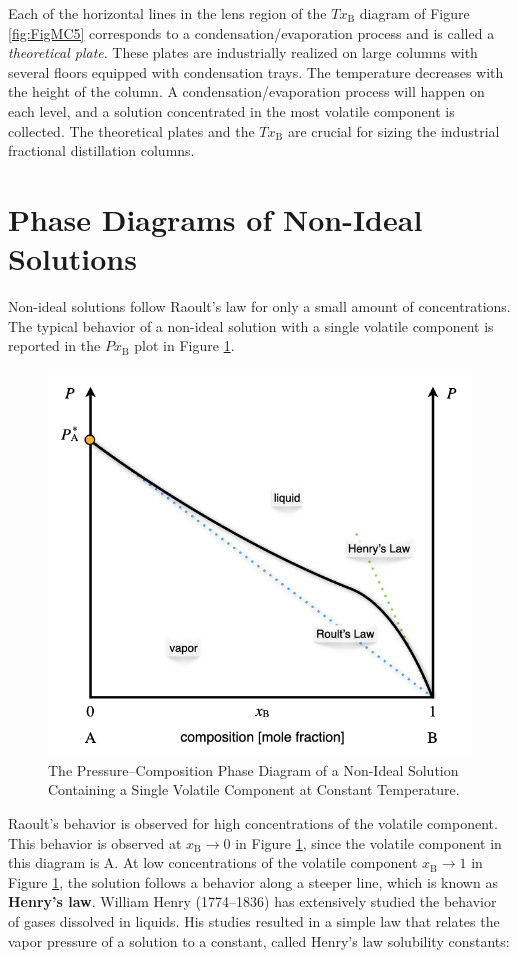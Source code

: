 \documentclass[
  9pt,
]{extbook}
\theoremstyle{definition}
\theoremstyle{definition}
\theoremstyle{definition}
\theoremstyle{remark}
\begin{document}
Each of the horizontal lines in the lens region of the \(Tx_{\text{B}}\) diagram of Figure \ref{fig:FigMC5} corresponds to a condensation/evaporation process and is called a \emph{theoretical plate}. These plates are industrially realized on large columns with several floors equipped with condensation trays. The temperature decreases with the height of the column. A condensation/evaporation process will happen on each level, and a solution concentrated in the most volatile component is collected. The theoretical plates and the \(Tx_{\text{B}}\) are crucial for sizing the industrial fractional distillation columns.

\hypertarget{phase-diagrams-of-non-ideal-solutions}{%
\section{Phase Diagrams of Non-Ideal Solutions}\label{phase-diagrams-of-non-ideal-solutions}}

Non-ideal solutions follow Raoult's law for only a small amount of concentrations. The typical behavior of a non-ideal solution with a single volatile component is reported in the \(Px_{\text{B}}\) plot in Figure \ref{fig:FigMC6}.

\begin{figure}

{\centering \includegraphics[width=0.6\linewidth]{./img/OEP_Figures.024} 

}

\caption{The Pressure–Composition Phase Diagram of a Non-Ideal Solution Containing a Single Volatile Component at Constant Temperature.}\label{fig:FigMC6}
\end{figure}

Raoult's behavior is observed for high concentrations of the volatile component. This behavior is observed at \(x_{\text{B}} \rightarrow 0\) in Figure \ref{fig:FigMC6}, since the volatile component in this diagram is \(\mathrm{A}\). At low concentrations of the volatile component \(x_{\text{B}} \rightarrow 1\) in Figure \ref{fig:FigMC6}, the solution follows a behavior along a steeper line, which is known as \textbf{Henry's law}. William Henry (1774--1836) has extensively studied the behavior of gases dissolved in liquids. His studies resulted in a simple law that relates the vapor pressure of a solution to a constant, called Henry's law solubility constants:
\end{document}
